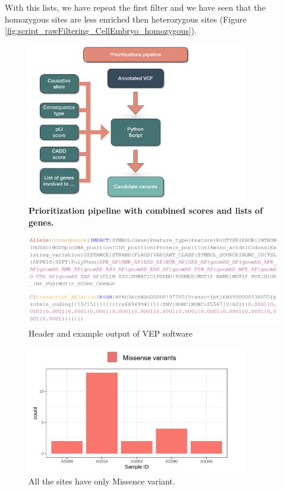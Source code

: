 \documentclass[
tikz,
11pt, %
oneside, %
english, %
singlespacing, %
headsepline, %
]{MastersDoctoralThesisV2} %
\begin{document}
With this lists, we have repeat the first filter and we have seen that the homozygous sites are less enriched then heterozygous sites (Figure \ref{fig:script_rawFiltering_CellEmbryo_homozygous}). 

\begin{figure}[H]
\centering
\includegraphics[width=0.85\textwidth]{fig/scriptPipeline.png}
\decoRule
\caption{\textbf{Prioritization pipeline with combined scores and lists of genes.}}
\label{fig:scriptPipeline}
\end{figure}

\begin{figure}[th]
\centering
\includegraphics[width=1\textwidth]{fig/vep_example_output.PNG}
\decoRule
\caption[Summary Consequence]{Header and example output of VEP software}
\label{fig:vep_example_output}
\end{figure}


\begin{figure}[H]
\centering
\includegraphics[width=0.85\textwidth]{fig/script_rawFiltering_homozygous.PNG}
\decoRule
\caption[Raw Filtering]{All the sites have only Missence variant.}
\label{fig:script_rawFiltering_homzygous}
\end{figure}
\end{document}
